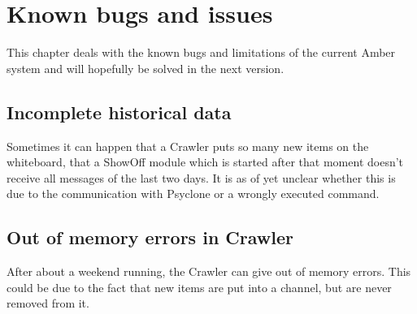 \chapter{\label{cpt:usage:known-bugs}Known bugs and issues}

This chapter deals with the known bugs and limitations of the current Amber
system and will hopefully be solved in the next version.

\section{Incomplete historical data}

Sometimes it can happen that a Crawler puts so many new items on the
whiteboard, that a ShowOff module which is started after that moment doesn't
receive all messages of the last two days. It is as of yet unclear whether this
is due to the communication with Psyclone or a wrongly executed command.

\section{Out of memory errors in Crawler}

After about a weekend running, the Crawler can give out of memory errors. This
could be due to the fact that new items are put into a channel, but are never
removed from it.
